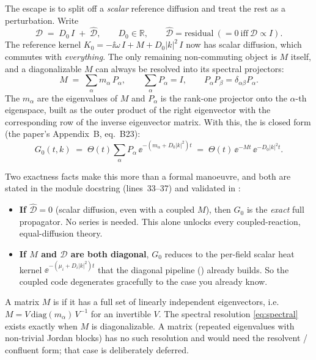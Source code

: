 The escape is to split off a \emph{scalar} reference diffusion and treat the
rest as a perturbation. Write
\begin{equation}
  \mathcal{D}\;=\;D_{0}\,I\;+\;\widehat{\mathcal{D}},
  \qquad D_{0}\in\mathbb{R},\qquad
  \widehat{\mathcal{D}}=\text{residual}\ (=0\ \text{iff}\ \mathcal{D}\propto I).
  \label{eq:Dsplit}
\end{equation}
The reference kernel $K_{0}=-\ii\omega\,I+M+D_{0}|k|^{2}\,I$ now has scalar
diffusion, which commutes with \emph{everything}. The only remaining
non-commuting object is $M$ itself, and a diagonalizable $M$ can always be
resolved into its spectral projectors:
\begin{equation}
  M\;=\;\sum_{\alpha} m_{\alpha}\,P_{\alpha},
  \qquad \sum_{\alpha}P_{\alpha}=I,
  \qquad P_{\alpha}P_{\beta}=\delta_{\alpha\beta}P_{\alpha}.
  \label{eq:spectral}
\end{equation}
The $m_{\alpha}$ are the eigenvalues of $M$ and $P_{\alpha}$ is the rank-one
projector onto the $\alpha$-th eigenspace, built as the outer product of the
right eigenvector with the corresponding row of the inverse eigenvector matrix.
With this, the  is closed form (the paper's
Appendix~B, eq.~B23):
\begin{equation}
  G_{0}(t,k)\;=\;\Theta(t)\sum_{\alpha}P_{\alpha}\,
     \ee^{-(m_{\alpha}+D_{0}|k|^{2})t}
   \;=\;\Theta(t)\,\ee^{-Mt}\,\ee^{-D_{0}|k|^{2}t}.
  \label{eq:G0}
\end{equation}

Two exactness facts make this more than a formal manoeuvre, and both are stated
in the module docstring (lines~33--37) and validated in
:
\begin{itemize}
  \item \textbf{If $\widehat{\mathcal{D}}=0$} (scalar diffusion, even with a
        coupled $M$), then $G_{0}$ is the \emph{exact} full propagator. No
        series is needed. This alone unlocks every coupled-reaction,
        equal-diffusion theory.
  \item \textbf{If $M$ and $\mathcal{D}$ are both diagonal}, $G_{0}$ reduces to
        the per-field scalar heat kernel $\ee^{-(\mu_{i}+D_{i}|k|^{2})t}$ that
        the diagonal pipeline () already builds. So the
        coupled code degenerates gracefully to the case you already know.
\end{itemize}

\begin{defn}
A matrix $M$ is  if it has a full set of linearly
independent eigenvectors, i.e. $M=V\,\mathrm{diag}(m_{\alpha})\,V^{-1}$ for an
invertible $V$. The spectral resolution \eqref{eq:spectral} exists exactly when
$M$ is diagonalizable. A  matrix (repeated eigenvalues with
non-trivial Jordan blocks) has no such resolution and would need the resolvent /
confluent form; that case is deliberately deferred.
\end{defn}

